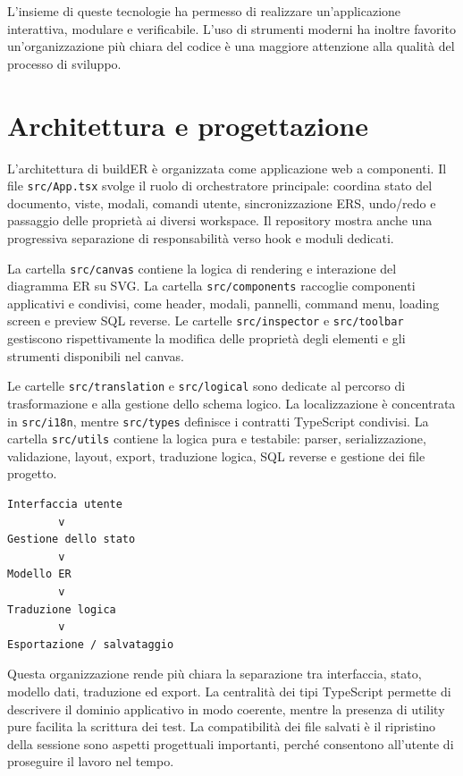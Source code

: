 \documentclass{unipd-thesis-modern}
\newcommand{\builder}{buildER}
\begin{document}
L'insieme di queste tecnologie ha permesso di realizzare un'applicazione interattiva, modulare e verificabile. L'uso di strumenti moderni ha inoltre favorito un'organizzazione più chiara del codice è una maggiore attenzione alla qualità del processo di sviluppo.

\chapter{Architettura e progettazione}

L'architettura di \builder{} è organizzata come applicazione web a componenti. Il file \texttt{src/App.tsx} svolge il ruolo di orchestratore principale: coordina stato del documento, viste, modali, comandi utente, sincronizzazione ERS, undo/redo e passaggio delle proprietà ai diversi workspace. Il repository mostra anche una progressiva separazione di responsabilità verso hook e moduli dedicati.

La cartella \texttt{src/canvas} contiene la logica di rendering e interazione del diagramma ER su SVG. La cartella \texttt{src/components} raccoglie componenti applicativi e condivisi, come header, modali, pannelli, command menu, loading screen e preview SQL reverse. Le cartelle \texttt{src/inspector} e \texttt{src/toolbar} gestiscono rispettivamente la modifica delle proprietà degli elementi e gli strumenti disponibili nel canvas.

Le cartelle \texttt{src/translation} e \texttt{src/logical} sono dedicate al percorso di trasformazione e alla gestione dello schema logico. La localizzazione è concentrata in \texttt{src/i18n}, mentre \texttt{src/types} definisce i contratti TypeScript condivisi. La cartella \texttt{src/utils} contiene la logica pura e testabile: parser, serializzazione, validazione, layout, export, traduzione logica, SQL reverse e gestione dei file progetto.

\begin{verbatim}
Interfaccia utente
        v
Gestione dello stato
        v
Modello ER
        v
Traduzione logica
        v
Esportazione / salvataggio
\end{verbatim}

Questa organizzazione rende più chiara la separazione tra interfaccia, stato, modello dati, traduzione ed export. La centralità dei tipi TypeScript permette di descrivere il dominio applicativo in modo coerente, mentre la presenza di utility pure facilita la scrittura dei test. La compatibilità dei file salvati è il ripristino della sessione sono aspetti progettuali importanti, perché consentono all'utente di proseguire il lavoro nel tempo.
\end{document}
